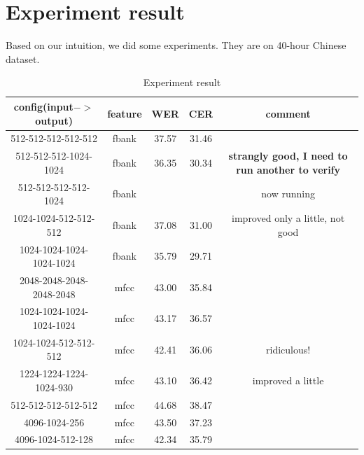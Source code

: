 \documentclass[11pt]{article}
\begin{document}
\section{Experiment result}
Based on our intuition, we did some experiments. They are on 40-hour Chinese dataset.
\begin{table}[htb]
\begin{tabular}{|c|c|c|c|c|}
\hline
\hline
config(input$->$output) & feature & WER & CER & comment\\
\hline
512-512-512-512-512 & fbank & 37.57 & 31.46 &\\
\hline
512-512-512-1024-1024 & fbank & 36.35 & 30.34 & \textbf{strangly good, I need to run another to verify}\\
\hline
512-512-512-512-1024 & fbank & & & now running \\
\hline
1024-1024-512-512-512 & fbank & 37.08 & 31.00 & improved only a little, not good\\
\hline
1024-1024-1024-1024-1024 & fbank & 35.79 & 29.71 &\\
\hline
\hline
2048-2048-2048-2048-2048 & mfcc & 43.00 & 35.84 & \\
\hline
1024-1024-1024-1024-1024 & mfcc & 43.17 & 36.57 & \\
\hline
1024-1024-512-512-512 & mfcc & 42.41 & 36.06 & ridiculous!\\
\hline
1224-1224-1224-1024-930 & mfcc & 43.10 & 36.42 & improved a little\\
\hline
512-512-512-512-512 & mfcc & 44.68 & 38.47 & \\
\hline
4096-1024-256 & mfcc & 43.50 & 37.23 & \\
\hline
4096-1024-512-128 & mfcc & 42.34 & 35.79  \\
\hline
\end{tabular}
\caption{Experiment result}
\end{table}
\end{document}

